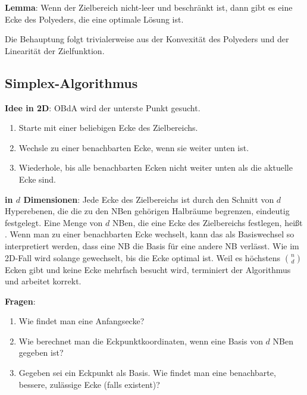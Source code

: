 \linie

\textbf{Lemma}:
Wenn der Zielbereich nicht-leer und beschränkt ist,
dann gibt es eine Ecke des Polyeders, die eine optimale Lösung ist.

\begin{Beweis}
    Die Behauptung folgt trivialerweise aus der Konvexität des Polyeders und der
    Linearität der Zielfunktion.
\end{Beweis}

\subsection{%
    Simplex-Algorithmus%
}

\textbf{Idee in 2D}:
OBdA wird der unterste Punkt gesucht.
\begin{enumerate}
    \item
    Starte mit einer beliebigen Ecke des Zielbereichs.
    
    \item
    Wechsle zu einer benachbarten Ecke, wenn sie weiter unten ist.
    
    \item
    Wiederhole, bis alle benachbarten Ecken nicht weiter unten als die aktuelle Ecke sind.
\end{enumerate}

\linie

\textbf{in $d$ Dimensionen}:
Jede Ecke des Zielbereichs ist durch den Schnitt von $d$ Hyperebenen,
die die zu den NBen gehörigen Halbräume begrenzen, eindeutig festgelegt.
Eine Menge von $d$ NBen, die eine Ecke des Zielbereichs festlegen, heißt .
Wenn man zu einer benachbarten Ecke wechselt, kann das als Basiswechsel so interpretiert werden,
dass eine NB die Basis für eine andere NB verlässt.
Wie im 2D-Fall wird solange gewechselt, bis die Ecke optimal ist.
Weil es höchstens $\binom{n}{d}$ Ecken gibt und keine Ecke mehrfach besucht wird,
terminiert der Algorithmus und arbeitet korrekt.

\linie
\pagebreak

\textbf{Fragen}:
\begin{enumerate}
    \item
    Wie findet man eine Anfangsecke?
    
    \item
    Wie berechnet man die Eckpunktkoordinaten, wenn eine Basis von $d$ NBen gegeben ist?
    
    \item
    Gegeben sei ein Eckpunkt als Basis.
    Wie findet man eine benachbarte, bessere, zulässige Ecke (falls existent)?
\end{enumerate}

